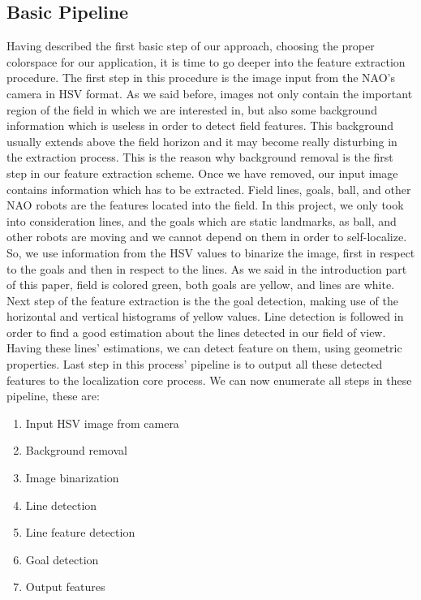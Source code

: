 \documentclass[	DIV=calc,%
							paper=a4,%
							fontsize=9pt,%
							twocolumn]{scrartcl}	 					%
\begin{document}
\subsection{Basic Pipeline}
Having described the first basic step of our approach, choosing the proper colorspace for our application, it is time to go deeper into the feature extraction procedure.
The first step in this procedure is the image input from the NAO's camera in HSV format. As we said before, images not only contain the important region of the field in which we are interested in, but also some background information which is useless in order to detect field features. This background usually extends above the field horizon and it may become really disturbing in the extraction process. This is the reason why background removal is the first step in our feature extraction scheme. Once we have removed, our input image contains information which has to be extracted. Field lines, goals, ball, and other NAO robots are the features located into the field. In this project, we only took into consideration lines, and the goals which are static landmarks, as ball, and other robots are moving and we cannot depend on them in order to self-localize. So, we use information from the HSV values to binarize the image, first in respect to the goals and then in respect to the lines. As we said in the introduction part of this paper, field is colored green, both goals are yellow, and lines are white. Next step of the feature extraction is the the goal detection, making use of the horizontal and vertical histograms of yellow values. Line detection is followed in order to find a good estimation about the lines detected in our field of view. Having these lines' estimations, we can detect feature on them, using geometric properties. Last step in this process' pipeline is to output all these detected features to the localization core process. We can now enumerate all steps in these pipeline, these are:
\begin{enumerate}
\item Input HSV image from camera
\item Background removal
\item Image binarization
\item Line detection
\item Line feature detection
\item Goal detection
\item Output features
\end{enumerate}
\end{document}
